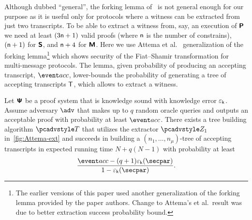 	
Although dubbed ``general'', the forking lemma of~\cite{CCS:BelNev06} is not general
enough for our purpose as it is useful only for protocols where a witness can be
extracted from just two transcripts. To be able to extract a witness from, say, an
execution of $\bm{\mathsf{P}}$ we need at least $(3 \mathsf{n} + 1)$ valid proofs
(where $\mathsf{n}$ is the number of constrains),
$(\mathsf{n}+ 1)$ for $\bm{\mathsf{S}}$, and $\mathsf{n} + 4$ for $\bm{\mathsf{M}}$. Here we use Attema et
al.~\cite{EPRINT:AttFehKlo21} generalization of the forking lemma\footnote{The
	earlier versions of this paper used another generalization of the forking lemma
	provided by the paper authors. Change to Attema's et al.~result was due to better
	extraction success probability bound.}  which shows security of the Fiat--Shamir
transformation for multi-message protocols. The lemma, given probability of producing
an accepting transcript, $\accProb$, lower-bounds the probability of generating a
tree of accepting transcripts $\mathsf{T}$, which allows to extract a witness.

\begin{lemma}\label{lem:attema}
	 Let $\bm{\mathsf{\Psi}}$ be a proof system that is knowledge sound
	with knowledge error $\varepsilon_{\mathsf{k}}$. Assume adversary $\adv$ that makes up to $q$ random
	oracle queries and outputs an acceptable proof with probability at least
	$\accProb$. There exists a tree building algorithm $\tdv$ that utilizes the extractor $\zdv_1$ in~\cref{fig:Attema-ext} and succeeds in building a
	$(n_1, \ldots, n_\mu)$-tree of accepting transcripts in expected
	running time $N + q (N - 1)$ with probability at least
	\[
	\frac{\accProb - (q + 1) \epsk (\secpar)}{1 - \epsk (\secpar)}.
	\]
	\end{lemma}

